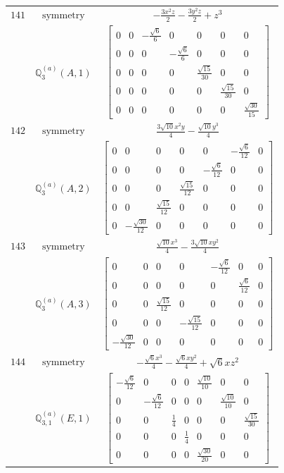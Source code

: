 \documentclass[fleqn,8pt,landscape]{jsarticle}
\begin{document}
\begin{longtable}{ccc}
$ 141 $ & $ \text{symmetry} $ & $ - \frac{3 x^{2} z}{2} - \frac{3 y^{2} z}{2} + z^{3} $ \\
$  $ & $ \mathbb{Q}_{3}^{(a)}(A,1) $ & $ \begin{bmatrix} 0 & 0 & - \frac{\sqrt{6}}{6} & 0 & 0 & 0 & 0 \\ 0 & 0 & 0 & - \frac{\sqrt{6}}{6} & 0 & 0 & 0 \\ 0 & 0 & 0 & 0 & \frac{\sqrt{15}}{30} & 0 & 0 \\ 0 & 0 & 0 & 0 & 0 & \frac{\sqrt{15}}{30} & 0 \\ 0 & 0 & 0 & 0 & 0 & 0 & \frac{\sqrt{30}}{15} \end{bmatrix} $ \\ \hline
$ 142 $ & $ \text{symmetry} $ & $ \frac{3 \sqrt{10} x^{2} y}{4} - \frac{\sqrt{10} y^{3}}{4} $ \\
$  $ & $ \mathbb{Q}_{3}^{(a)}(A,2) $ & $ \begin{bmatrix} 0 & 0 & 0 & 0 & 0 & - \frac{\sqrt{6}}{12} & 0 \\ 0 & 0 & 0 & 0 & - \frac{\sqrt{6}}{12} & 0 & 0 \\ 0 & 0 & 0 & \frac{\sqrt{15}}{12} & 0 & 0 & 0 \\ 0 & 0 & \frac{\sqrt{15}}{12} & 0 & 0 & 0 & 0 \\ 0 & - \frac{\sqrt{30}}{12} & 0 & 0 & 0 & 0 & 0 \end{bmatrix} $ \\ \hline
$ 143 $ & $ \text{symmetry} $ & $ \frac{\sqrt{10} x^{3}}{4} - \frac{3 \sqrt{10} x y^{2}}{4} $ \\
$  $ & $ \mathbb{Q}_{3}^{(a)}(A,3) $ & $ \begin{bmatrix} 0 & 0 & 0 & 0 & - \frac{\sqrt{6}}{12} & 0 & 0 \\ 0 & 0 & 0 & 0 & 0 & \frac{\sqrt{6}}{12} & 0 \\ 0 & 0 & \frac{\sqrt{15}}{12} & 0 & 0 & 0 & 0 \\ 0 & 0 & 0 & - \frac{\sqrt{15}}{12} & 0 & 0 & 0 \\ - \frac{\sqrt{30}}{12} & 0 & 0 & 0 & 0 & 0 & 0 \end{bmatrix} $ \\ \hline
$ 144 $ & $ \text{symmetry} $ & $ - \frac{\sqrt{6} x^{3}}{4} - \frac{\sqrt{6} x y^{2}}{4} + \sqrt{6} x z^{2} $ \\
$  $ & $ \mathbb{Q}_{3,1}^{(a)}(E,1) $ & $ \begin{bmatrix} - \frac{\sqrt{6}}{12} & 0 & 0 & 0 & \frac{\sqrt{10}}{10} & 0 & 0 \\ 0 & - \frac{\sqrt{6}}{12} & 0 & 0 & 0 & \frac{\sqrt{10}}{10} & 0 \\ 0 & 0 & \frac{1}{4} & 0 & 0 & 0 & \frac{\sqrt{15}}{30} \\ 0 & 0 & 0 & \frac{1}{4} & 0 & 0 & 0 \\ 0 & 0 & 0 & 0 & \frac{\sqrt{30}}{20} & 0 & 0 \end{bmatrix} $ \\ \hline

\end{longtable}
\end{document}
